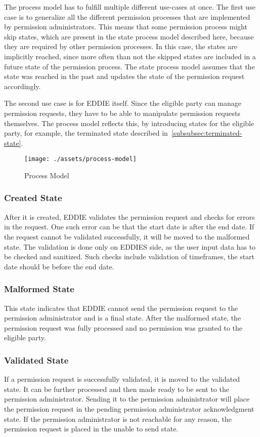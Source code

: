 The process model has to fulfill multiple different use-cases at once.
The first use case is to generalize all the different permission processes that are implemented by permission administrators.
This means that some permission process might skip states, which are present in the state process model described here, because they are required by other permission processes.
In this case, the states are implicitly reached, since more often than not the skipped states are included in a future state of the permission process.
The state process model assumes that the state was reached in the past and updates the state of the permission request accordingly.

The second use case is for EDDIE itself.
Since the eligible party can manage permission requests, they have to be able to manipulate permission requests themselves.
The process model reflects this, by introducing states for the eligible party, for example, the terminated state described in\ \ref{subsubsec:terminated-state}.

\begin{figure}[h]
    \texttt{[image: ./assets/process-model]}
    \caption{Process Model}
    \label{fig:process-model}
\end{figure}

\subsubsection{Created State}
After it is created, EDDIE validates the permission request and checks for errors in the request.
One such error can be that the start date is after the end date.
If the request cannot be validated successfully, it will be moved to the malformed state.
The validation is done only on EDDIES side, as the user input data has to be checked and sanitized.
Such checks include validation of timeframes, the start date should be before the end date.

\subsubsection{Malformed State}
This state indicates that EDDIE cannot send the permission request to the permission administrator and is a final state.
After the malformed state, the permission request was fully processed and no permission was granted to the eligible party.

\subsubsection{Validated State}
If a permission request is successfully validated, it is moved to the validated state.
It can be further processed and then made ready to be sent to the permission administrator.
Sending it to the permission administrator will place the permission request in the pending permission administrator acknowledgment state.
If the permission administrator is not reachable for any reason, the permission request is placed in the unable to send state.

